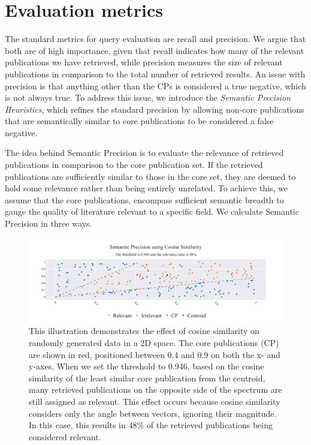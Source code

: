 \section{Evaluation metrics}\label{sec:eval-metrics}
The standard metrics for query evaluation are recall and precision. We argue that both are of high importance, given that recall indicates how many of the relevant publications we have retrieved, while precision measures the size of relevant publications in comparison to the total number of retrieved results. An issue with precision is that anything other than the CPs is considered a true negative, which is not always true. To address this issue, we introduce the \textit{Semantic Precision Heuristics}, which refines the standard precision by allowing non-core publications that are semantically similar to core publications to be considered a false negative.

The idea behind Semantic Precision is to evaluate the relevance of retrieved publications in comparison to the core publication set. If the retrieved publications are sufficiently similar to those in the core set, they are deemed to hold some relevance rather than being entirely unrelated. To achieve this, we assume that the core publications, encompass sufficient semantic breadth to gauge the quality of literature relevant to a specific field. We calculate Semantic Precision in three ways.

\begin{figure}
	\hspace*{-1cm}
	\includegraphics[scale=0.48]{pics/sp_cos.pdf}
	\caption[Semantic Precision using Cosine Similarity]{This illustration demonstrates the effect of cosine similarity on randomly generated data in a 2D space. The core publications (CP) are shown in red, positioned between 0.4 and 0.9 on both the x- and y-axes. When we set the threshold to 0.946, based on the cosine similarity of the least similar core publication from the centroid, many retrieved publications on the opposite side of the spectrum are still assigned as relevant. This effect occurs because cosine similarity considers only the angle between vectors, ignoring their magnitude. In this case, this results in 48\% of the retrieved publications being considered relevant.}

	\label{fig:sp-cos}
\end{figure}

